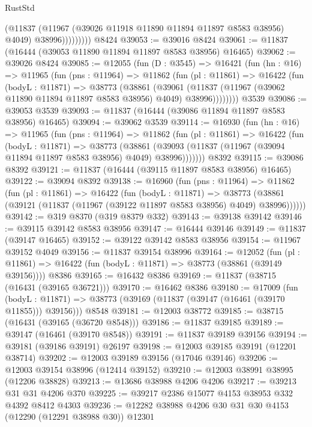 \begin{lexlean}{RustStd}
\begin{coremodule}
                    (@11837
                      (@11967 (@39026 @11918 @11890 @11894 @11897 @8583 @38956) @4049)
                      @38996)))))))))
    @8424
@39053 := @39016 @8424
@39061 := @11837 (@16444 (@39053 @11890 @11894 @11897 @8583 @38956) @16465)
@39062 := @39026 @8424
@39085 := @12055
    (fun (D : @3545) =>
    @16421
      (fun (hn : @16) =>
      @11965
        (fun (pns : @11964) =>
        @11862
          (fun (pl : @11861) =>
          @16422
            (fun (bodyL : @11871) =>
            @38773
              (@38861
                (@39061
                  (@11837 (@11967 (@39062 @11890 @11894 @11897 @8583 @38956) @4049) @38996))))))))
    @3539
@39086 := @39053 @3539
@39093 := @11837 (@16444 (@39086 @11894 @11897 @8583 @38956) @16465)
@39094 := @39062 @3539
@39114 := @16930
    (fun (hn : @16) =>
    @11965
      (fun (pns : @11964) =>
      @11862
        (fun (pl : @11861) =>
        @16422
          (fun (bodyL : @11871) =>
          @38773
            (@38861 (@39093 (@11837 (@11967 (@39094 @11894 @11897 @8583 @38956) @4049) @38996)))))))
    @8392
@39115 := @39086 @8392
@39121 := @11837 (@16444 (@39115 @11897 @8583 @38956) @16465)
@39122 := @39094 @8392
@39138 := @16960
    (fun (pns : @11964) =>
    @11862
      (fun (pl : @11861) =>
      @16422
        (fun (bodyL : @11871) =>
        @38773 (@38861 (@39121 (@11837 (@11967 (@39122 @11897 @8583 @38956) @4049) @38996))))))
@39142 := @319 @8370 (@319 @8379 @332)
@39143 := @39138 @39142
@39146 := @39115 @39142 @8583 @38956
@39147 := @16444 @39146
@39149 := @11837 (@39147 @16465)
@39152 := @39122 @39142 @8583 @38956
@39154 := @11967 @39152 @4049
@39156 := @11837 @39154 @38996
@39164 := @12052
    (fun (pl : @11861) => @16422 (fun (bodyL : @11871) => @38773 (@38861 (@39149 @39156))))
    @8386
@39165 := @16432 @8386
@39169 := @11837 (@38715 (@16431 (@39165 @36721)))
@39170 := @16462 @8386
@39180 := @17009
    (fun (bodyL : @11871) => @38773 (@39169 (@11837 (@39147 (@16461 (@39170 @11855))) @39156)))
    @8548
@39181 := @12003 @38772
@39185 := @38715 (@16431 (@39165 (@36720 @8548)))
@39186 := @11837 @39185
@39189 := @39147 (@16461 (@39170 @8548))
@39191 := @11837 @39189 @39156
@39194 := @39181 (@39186 @39191) @26197
@39198 := @12003 @39185 @39191 (@12201 @38714)
@39202 := @12003 @39189 @39156 (@17046 @39146)
@39206 := @12003 @39154 @38996 (@12414 @39152)
@39210 := @12003 @38991 @38995 (@12206 @38828)
@39213 := @13686 @38988 @4206 @4206
@39217 := @39213 @31 @31 @4206 @370
@39225 := @39217 @2386 @15077 @4153 @38953 @332 @4392 @8412 @4303
@39236 := @12282 @38988 @4206 @30 @31 @30 @4153 (@12290 (@12291 @38988 @30)) @12301

\end{coremodule}
\end{lexlean}

